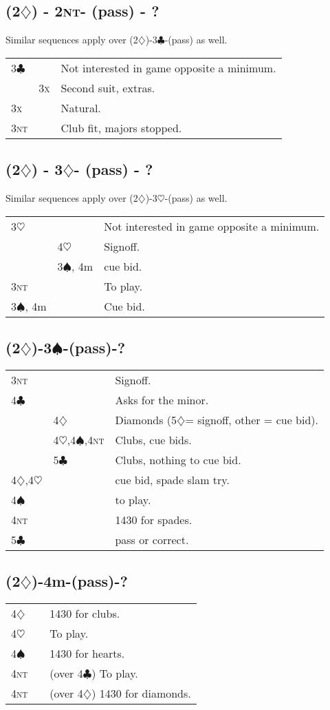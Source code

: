 \documentclass{article}
\renewcommand{\c}{\ensuremath{\clubsuit}}
\renewcommand{\d}{\ensuremath{\diamondsuit}}
\newcommand{\h}{\ensuremath{\heartsuit}}
\newcommand{\s}{\ensuremath{\spadesuit}}
\newcommand{\nt}{\textsc{nt}}
\newcommand{\x}{\textsc{x}}
\newcommand{\+}{\ensuremath{^+}}
\begin{document}
\subsection{(2\d) - 2\nt - (pass) - ?}

Similar sequences apply over (2\d)-3\c-(pass) as well.

\begin{tabular}{lll}
3\c &&Not interested in game opposite a minimum.\\
& 3\x & Second suit, extras.\\
3\x && Natural.\\
3\nt && Club fit, majors stopped.\\
\end{tabular}


\subsection{(2\d) - 3\d - (pass) - ?}

Similar sequences apply over (2\d)-3\h-(pass) as well.

\begin{tabular}{lll}
3\h && Not interested in game opposite a minimum.\\
& 4\h & Signoff.\\
& 3\s, 4m & cue bid.\\
3\nt && To play.\\
3\s, 4m && Cue bid.\\
\end{tabular}

\subsection{(2\d)-3\s-(pass)-?}
\begin{tabular}{lll}
3\nt && Signoff.\\
4\c && Asks for the minor.\\
& 4\d & Diamonds (5\d = signoff, other = cue bid).\\
& 4\h,4\s,4\nt & Clubs, cue bids.\\
& 5\c & Clubs, nothing to cue bid.\\
4\d,4\h && cue bid, spade slam try.\\
4\s && to play.\\
4\nt && 1430 for spades.\\
5\c && pass or correct.
\end{tabular}

\subsection{(2\d)-4m-(pass)-?}
\begin{tabular}{lll}
4\d && 1430 for clubs.\\
4\h && To play.\\
4\s && 1430 for hearts.\\
4\nt && (over 4\c) To play.\\
4\nt && (over 4\d) 1430 for diamonds.\\
\end{tabular}
\end{document}
